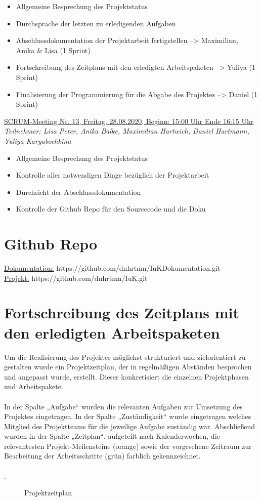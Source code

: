 \documentclass[a4paper,report,headsepline]{scrreprt}
\begin{document}
\begin{itemize}
\item Allgemeine Besprechung des Projektstatus 
\item Durchsprache der letzten zu erledigenden Aufgaben 
\item Abschlussdokumentation der Projektarbeit fertigstellen --> Maximilian, Anika \& Lisa (1 Sprint) 
\item Fortschreibung des Zeitplans mit den erledigten Arbeitspaketen --> Yuliya (1 Sprint) 
\item Finalisierung der Programmierung für die Abgabe des Projektes --> Daniel (1 Sprint) 
\end{itemize}
\underline{{\large SCRUM-Meeting Nr. 13, Freitag, 28.08.2020, Beginn: 15:00 Uhr Ende 16:15 Uhr}} \\
\textit{Teilnehmer: Lisa Peter, Anika Balke, Maximilian Hartwich, Daniel Hartmann, Yuliya Karyabochkina}

\begin{itemize}
\item Allgemeine Besprechung des Projektstatus 
\item Kontrolle aller notwendigen Dinge bezüglich der Projektarbeit 
\item Durchsicht der Abschlussdokumentation 
\item Kontrolle der Github Repo für den Sourcecode und die Doku 
\end{itemize}
     
\chapter{Github Repo}
\underline{Dokumentation:} https://github.com/dnhrtmn/IuKDokumentation.git \\
\underline{Projekt:} https://github.com/dnhrtmn/IuK.git
\chapter{Fortschreibung des Zeitplans mit den erledigten Arbeitspaketen}
Um die Realisierung des Projektes möglichst strukturiert und zielorientiert zu gestalten wurde ein Projektzeitplan, der in regelmäßigen Abständen besprochen und angepasst wurde, erstellt. Dieser konkretisiert die einzelnen Projektphasen und Arbeitspakete. \\ 
\\
In der Spalte „Aufgabe“ wurden die relevanten Aufgaben zur Umsetzung des Projektes eingetragen. In der Spalte „Zuständigkeit“ wurde eingetragen welches Mitglied des Projektteams für die jeweilige Aufgabe zuständig war. Abschließend wurden in der Spalte „Zeitplan“, aufgeteilt nach Kalenderwochen, die relevantesten Projekt-Meilensteine (orange) sowie der vorgesehene Zeitraum zur Bearbeitung der Arbeitsschritte (grün) farblich gekennzeichnet. \\
\\
.
\begin{figure}[h]
    \centering
    \caption{Projektzeitplan}

    \label{fig:Projektzeitplan}
\end{figure}
\end{document}

